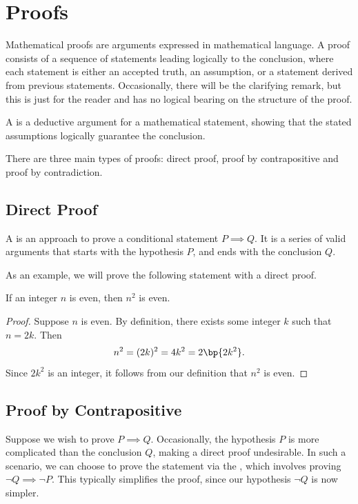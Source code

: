 \chapter{Proofs}

Mathematical proofs are arguments expressed in mathematical language. A proof consists of a sequence of statements leading logically to the conclusion, where each statement is either an accepted truth, an assumption, or a statement derived from previous statements. Occasionally, there will be the clarifying remark, but this is just for the reader and has no logical bearing on the structure of the proof.

\begin{definition}
    A  is a deductive argument for a mathematical statement, showing that the stated assumptions logically guarantee the conclusion.
\end{definition}

There are three main types of proofs: direct proof, proof by contrapositive and proof by contradiction.

\section{Direct Proof}

A  is an approach to prove a conditional statement $P \implies Q$. It is a series of valid arguments that starts with the hypothesis $P$, and ends with the conclusion $Q$.

As an example, we will prove the following statement with a direct proof.

\begin{statement}
    If an integer $n$ is even, then $n^2$ is even.
\end{statement}
\begin{proof}
    Suppose $n$ is even. By definition, there exists some integer $k$ such that $n = 2k$. Then \[n^2 = (2k)^2 = 4k^2 = 2\bp{2k^2}.\] Since $2k^2$ is an integer, it follows from our definition that $n^2$ is even.
\end{proof}

\section{Proof by Contrapositive}

Suppose we wish to prove $P \implies Q$. Occasionally, the hypothesis $P$ is more complicated than the conclusion $Q$, making a direct proof undesirable. In such a scenario, we can choose to prove the statement via the , which involves proving $\lnot Q \implies \lnot P$. This typically simplifies the proof, since our hypothesis $\lnot Q$ is now simpler.


